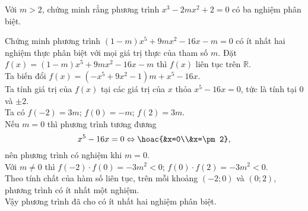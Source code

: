 \begin{bt}%
Với $m>2$, chứng minh rằng phương trình $x^3-2mx^2+2=0$ có ba nghiệm phân biệt. 
\end{bt}
\begin{bt}%
Chứng minh phương trình $\left(1-m\right)x^5+9mx^2-16x-m=0$ có ít nhất hai nghiệm thực phân biệt với mọi giá trị thực của tham số $m$.
\loigiai
{Đặt $f(x)=\left(1-m\right)x^5+9mx^2-16x-m$ thì $f(x)$ liên tục trên $\mathbb{R}$.\\ 
Ta biến đổi $f(x)=\left(-x^5+9x^2-1\right)m+x^5-16x$. \\
Ta tính giá trị của $f(x)$ tại các giá trị của $x$ thỏa $x^5-16x=0$, tức là tính tại $0$ và $\pm 2$.\\
Ta có $f(-2)=3m$; $f(0)=-m$; $f(2)=3m$.\\
Nếu $m=0$ thì phương trình tương đương $$x^5-16x=0\Leftrightarrow \hoac{&x=0\\&x=\pm2},$$ nên phương trình có nghiệm khi $m=0$.\\
Với $m\ne 0$ thì $f(-2)\cdot f(0)=-3m^2<0$; $f(0)\cdot f(2)=-3m^2<0$. \\
Theo tính chất của hàm số liên tục, trên mỗi khoảng $(-2;0)$ và $(0;2)$, phương trình có ít nhất một nghiệm.\\
Vậy phương trình đã cho có ít nhất hai nghiệm phân biệt.
}
\end{bt}
